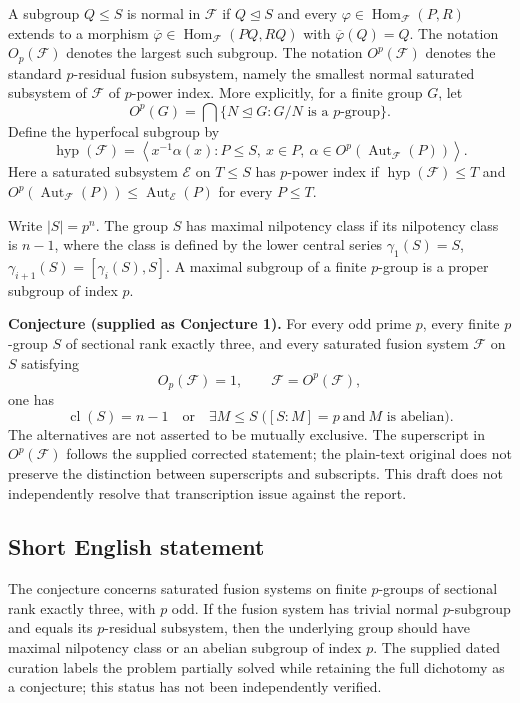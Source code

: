 \documentclass[11pt]{article}
\begin{document}
A subgroup \(Q\leq S\) is normal in \(\mathcal F\) if \(Q\trianglelefteq S\) and every \(\varphi\in\operatorname{Hom}_{\mathcal F}(P,R)\) extends to a morphism \(\overline\varphi\in\operatorname{Hom}_{\mathcal F}(PQ,RQ)\) with \(\overline\varphi(Q)=Q\). The notation \(O_p(\mathcal F)\) denotes the largest such subgroup. The notation \(O^p(\mathcal F)\) denotes the standard \(p\)-residual fusion subsystem, namely the smallest normal saturated subsystem of \(\mathcal F\) of \(p\)-power index. More explicitly, for a finite group \(G\), let
\[
O^p(G)=\bigcap\{N\trianglelefteq G:G/N\text{ is a }p\text{-group}\}.
\]
Define the hyperfocal subgroup by
\[
\operatorname{hyp}(\mathcal F)=\left\langle x^{-1}\alpha(x):P\leq S,\ x\in P,\ \alpha\in O^p(\operatorname{Aut}_{\mathcal F}(P))\right\rangle.
\]
Here a saturated subsystem \(\mathcal E\) on \(T\leq S\) has \(p\)-power index if \(\operatorname{hyp}(\mathcal F)\leq T\) and \(O^p(\operatorname{Aut}_{\mathcal F}(P))\leq\operatorname{Aut}_{\mathcal E}(P)\) for every \(P\leq T\).

Write \(|S|=p^n\). The group \(S\) has maximal nilpotency class if its nilpotency class is \(n-1\), where the class is defined by the lower central series \(\gamma_1(S)=S\), \(\gamma_{i+1}(S)=[\gamma_i(S),S]\). A maximal subgroup of a finite \(p\)-group is a proper subgroup of index \(p\).

\textbf{Conjecture (supplied as Conjecture 1).} For every odd prime \(p\), every finite \(p\)-group \(S\) of sectional rank exactly three, and every saturated fusion system \(\mathcal F\) on \(S\) satisfying
\[
O_p(\mathcal F)=1,\qquad \mathcal F=O^p(\mathcal F),
\]
one has
\[
\operatorname{cl}(S)=n-1
\quad\text{or}\quad
\exists M\leq S\;\bigl([S:M]=p\ \text{and}\ M\text{ is abelian}\bigr).
\]
The alternatives are not asserted to be mutually exclusive. The superscript in \(O^p(\mathcal F)\) follows the supplied corrected statement; the plain-text original does not preserve the distinction between superscripts and subscripts. This draft does not independently resolve that transcription issue against the report.
\subsection{Short English statement}
The conjecture concerns saturated fusion systems on finite \(p\)-groups of sectional rank exactly three, with \(p\) odd. If the fusion system has trivial normal \(p\)-subgroup and equals its \(p\)-residual subsystem, then the underlying group should have maximal nilpotency class or an abelian subgroup of index \(p\). The supplied dated curation labels the problem partially solved while retaining the full dichotomy as a conjecture; this status has not been independently verified.
\end{document}
